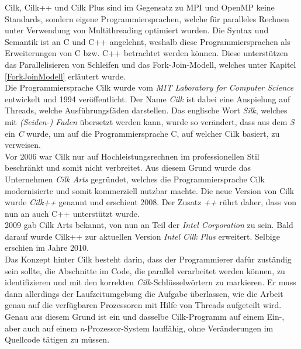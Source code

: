 			Cilk, Cilk++ und Cilk Plus sind im Gegensatz zu MPI und OpenMP keine Standards, sondern eigene Programmiersprachen, welche für paralleles Rechnen unter Verwendung von Multithreading optimiert wurden. Die Syntax und Semantik ist an C und C++ angelehnt, weshalb diese Programmiersprachen als Erweiterungen von C bzw. C++ betrachtet werden können. Diese unterstützen das Parallelisieren von Schleifen und das Fork-Join-Modell, welches unter Kapitel \ref{ForkJoinModell} erläutert wurde.\\
			Die Programmiersprache Cilk wurde vom \textit{MIT Laboratory for Computer Science} entwickelt und 1994 veröffentlicht. Der Name \textit{Cilk} ist dabei eine Anspielung auf Threads, welche Ausführungsfäden darstellen. Das englische Wort \textit{Silk}, welches mit \textit{(Seiden-) Faden} übersetzt werden kann, wurde so verändert, dass aus dem \textit{S} ein \textit{C} wurde, um auf die Programmiersprache C, auf welcher Cilk basiert, zu verweisen.\\
			Vor 2006 war Cilk nur auf Hochleistungsrechnen im professionellen Stil beschränkt und somit nicht verbreitet. Aus diesem Grund wurde das Unternehmen \textit{Cilk Arts} gegründet, welches die Programmiersprache Cilk modernisierte und somit kommerziell nutzbar machte. Die neue Version von Cilk wurde \textit{Cilk++} genannt und erschient 2008. Der Zusatz \textit{++} rührt daher, dass von nun an auch C++ unterstützt wurde.\\
			2009 gab Cilk Arts bekannt, von nun an Teil der \textit{Intel Corporation} zu sein. Bald darauf wurde Cilk++ zur aktuellen Version \textit{Intel Cilk Plus} erweitert. Selbige erschien im Jahre 2010.\\
			Das Konzept hinter Cilk besteht darin, dass der Programmierer dafür zuständig sein sollte, die Abschnitte im Code, die parallel verarbeitet werden können, zu identifizieren und mit den korrekten \textit{Cilk}-Schlüsselwörtern zu markieren. Er muss dann allerdings der Laufzeitumgebung die Aufgabe überlassen, wie die Arbeit genau auf die verfügbaren Prozessoren mit Hilfe von Threads aufgeteilt wird. Genau aus diesem Grund ist ein und dasselbe Cilk-Programm auf einem Ein-, aber auch auf einem \textit{n}-Prozessor-System lauffähig, ohne Veränderungen im Quellcode tätigen zu müssen.\\
